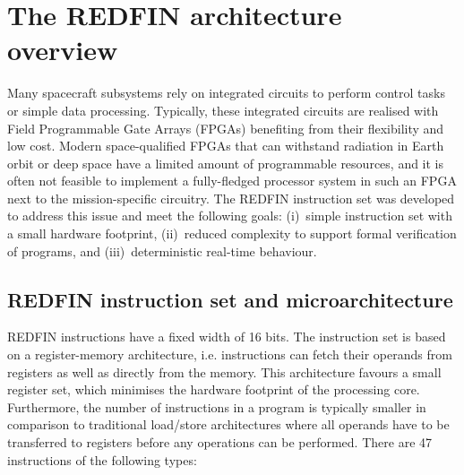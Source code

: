 \section{The REDFIN architecture overview\label{sec-redfin}}

Many spacecraft subsystems rely on integrated circuits to perform control tasks
or simple data processing. Typically, these integrated circuits are realised
with Field Programmable Gate Arrays (FPGAs) benefiting from their flexibility
and low cost. Modern space-qualified FPGAs that can withstand radiation in Earth
orbit or deep space have a limited amount of programmable resources, and it is
often not feasible to implement a fully-fledged processor system in such an FPGA
next to the mission-specific circuitry.
The REDFIN instruction set was developed to address this issue and meet the
following goals: (i)~simple instruction set with a small hardware footprint,
(ii)~reduced complexity to support formal verification of programs, and
(iii)~deterministic real-time behaviour.

\subsection{REDFIN instruction set and microarchitecture}

REDFIN instructions have a fixed width of 16 bits.
The instruction set is based on a register-memory architecture, i.e.
instructions can fetch their operands from registers as well as directly from the
memory. This architecture favours a small register set, which minimises the hardware
footprint of the processing core. Furthermore, the number of instructions in a
program is typically smaller in comparison to traditional load/store architectures
where all operands have to be transferred to registers before any operations can
be performed. There are 47 instructions of the following types:

